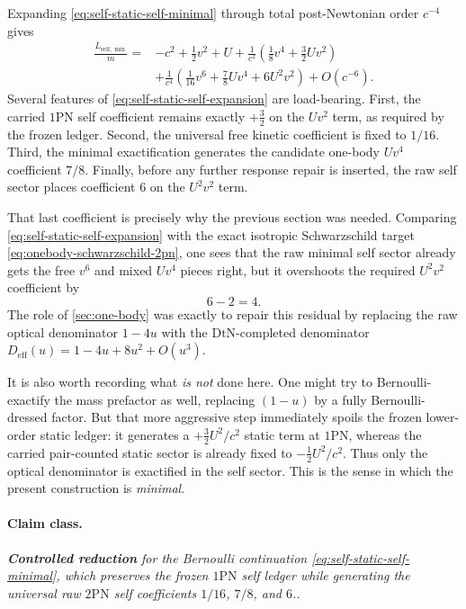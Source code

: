 \documentclass[11pt]{article}
\newcommand{\OnePN}{\mathrm{1PN}}
\newcommand{\TwoPN}{\mathrm{2PN}}
\newcommand{\DtN}{\mathrm{DtN}}
\newcommand{\Controlled}{\textbf{Controlled reduction}}
\newcommand{\claimclass}[1]{\paragraph{Claim class.}\emph{#1.}}
\begin{document}
Expanding \cref{eq:self-static-self-minimal} through total post-Newtonian order
\(c^{-4}\) gives
\begin{align}
\frac{L_{\mathrm{self},\min}}{m}
={}&-c^2
+\frac12 v^2+U
+\frac{1}{c^2}\left(\frac18 v^4+\frac32 Uv^2\right)
\nonumber\\
&
+\frac{1}{c^4}\left(\frac1{16}v^6+\frac78 Uv^4+6U^2v^2\right)
+O(c^{-6}).
\label{eq:self-static-self-expansion}
\end{align}
Several features of \cref{eq:self-static-self-expansion} are load-bearing.
First, the carried \(\OnePN\) self coefficient remains exactly \(+\frac32\) on the
\(Uv^2\) term, as required by the frozen ledger.  Second, the universal free kinetic
coefficient is fixed to \(1/16\).  Third, the minimal exactification generates the
candidate one-body \(Uv^4\) coefficient \(7/8\).  Finally, before any further response
repair is inserted, the raw self sector places coefficient \(6\) on the \(U^2v^2\) term.

That last coefficient is precisely why the previous section was needed.  Comparing
\cref{eq:self-static-self-expansion} with the exact isotropic Schwarzschild target
\cref{eq:onebody-schwarzschild-2pn}, one sees that the raw minimal self sector already
gets the free \(v^6\) and mixed \(Uv^4\) pieces right, but it overshoots the required
\(U^2v^2\) coefficient by
\begin{equation}
6-2=4.
\label{eq:self-static-u2v2-residual}
\end{equation}
The role of \cref{sec:one-body} was exactly to repair this residual by replacing the raw
optical denominator \(1-4u\) with the \(\DtN\)-completed denominator
\(D_{\mathrm{eff}}(u)=1-4u+8u^2+O(u^3)\).

It is also worth recording what \emph{is not} done here.  One might try to Bernoulli-
exactify the mass prefactor as well, replacing \((1-u)\) by a fully Bernoulli-dressed
factor.  But that more aggressive step immediately spoils the frozen lower-order static
ledger: it generates a \(+\frac32 U^2/c^2\) static term at \(\OnePN\), whereas the carried
pair-counted static sector is already fixed to \(-\frac12 U^2/c^2\).  Thus only the
optical denominator is exactified in the self sector.  This is the sense in which the
present construction is \emph{minimal}.

\claimclass{\Controlled{} for the Bernoulli continuation
\cref{eq:self-static-self-minimal}, which preserves the frozen \(\OnePN\) self ledger
while generating the universal raw \(\TwoPN\) self coefficients
\(1/16\), \(7/8\), and \(6\).}
\end{document}
